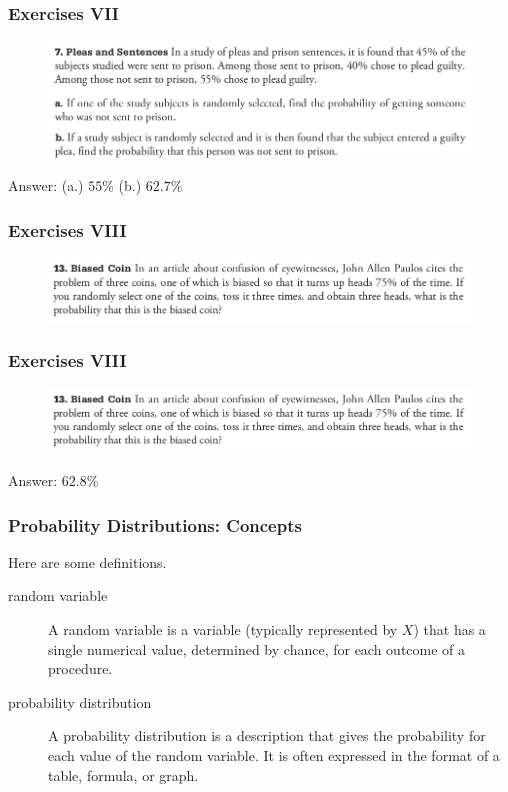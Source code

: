\documentclass[xcolor=dvipsnames]{beamer}
\begin{document}
\begin{frame}
  \frametitle{Exercises VII}
\begin{figure}[h]
\includegraphics[scale=.36]{./diagrams/triola_bayes2.png}
\end{figure}
Answer: (a.) $55$\% (b.) $62.7$\%
\end{frame}

\begin{frame}
  \frametitle{Exercises VIII}
\begin{figure}[h]
\includegraphics[scale=.36]{./diagrams/triola_bayes3.png}
\end{figure}
\end{frame}

\begin{frame}
  \frametitle{Exercises VIII}
\begin{figure}[h]
\includegraphics[scale=.36]{./diagrams/triola_bayes3.png}
\end{figure}
Answer: $62.8$\%
\end{frame}

\begin{frame}
  \frametitle{Probability Distributions: Concepts}
Here are some definitions.
\begin{description}
\item[random variable] A random variable is a variable (typically
  represented by $X$) that has a single numerical value, determined by
  chance, for each outcome of a procedure.
\item[probability distribution] A probability distribution is a
  description that gives the probability for each value of the random
  variable. It is often expressed in the format of a table, formula,
  or graph.
\end{description}
\end{frame}
\end{document}
